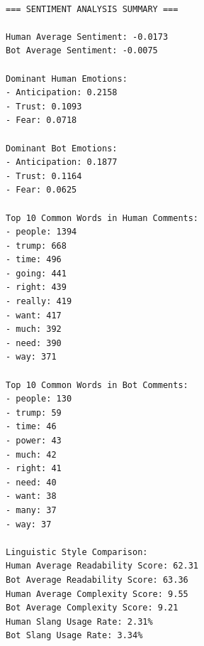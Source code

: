 \documentclass[
  12pt,
  letterpaper,
  DIV=11,
  numbers=noendperiod]{scrartcl}
\begin{document}
\begin{verbatim}

=== SENTIMENT ANALYSIS SUMMARY ===

Human Average Sentiment: -0.0173
Bot Average Sentiment: -0.0075

Dominant Human Emotions:
- Anticipation: 0.2158
- Trust: 0.1093
- Fear: 0.0718

Dominant Bot Emotions:
- Anticipation: 0.1877
- Trust: 0.1164
- Fear: 0.0625

Top 10 Common Words in Human Comments:
- people: 1394
- trump: 668
- time: 496
- going: 441
- right: 439
- really: 419
- want: 417
- much: 392
- need: 390
- way: 371

Top 10 Common Words in Bot Comments:
- people: 130
- trump: 59
- time: 46
- power: 43
- much: 42
- right: 41
- need: 40
- want: 38
- many: 37
- way: 37

Linguistic Style Comparison:
Human Average Readability Score: 62.31
Bot Average Readability Score: 63.36
Human Average Complexity Score: 9.55
Bot Average Complexity Score: 9.21
Human Slang Usage Rate: 2.31%
Bot Slang Usage Rate: 3.34%
\end{verbatim}
\end{document}
